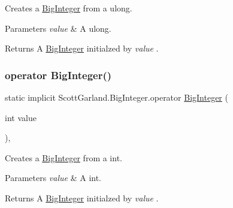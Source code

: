 Creates a \hyperlink{class_scott_garland_1_1_big_integer}{Big\+Integer} from a ulong. 


\begin{DoxyParams}{Parameters}
{\em value} & A ulong.\\
\hline
\end{DoxyParams}
\begin{DoxyReturn}{Returns}
A \hyperlink{class_scott_garland_1_1_big_integer}{Big\+Integer} initialzed by {\itshape value} .
\end{DoxyReturn}
\mbox{\label{class_scott_garland_1_1_big_integer_a3a17f77a3e90cf657d105559ad35fecf}} 
\subsubsection{\texorpdfstring{operator Big\+Integer()}{operator BigInteger()}\hspace{0.1cm}{\footnotesize\ttfamily [3/4]}}
{\footnotesize\ttfamily static implicit Scott\+Garland.\+Big\+Integer.\+operator \hyperlink{class_scott_garland_1_1_big_integer}{Big\+Integer} (\begin{DoxyParamCaption}\item[{int}]{value }\end{DoxyParamCaption})\hspace{0.3cm}{\ttfamily [inline]}, {\ttfamily [static]}}



Creates a \hyperlink{class_scott_garland_1_1_big_integer}{Big\+Integer} from a int. 


\begin{DoxyParams}{Parameters}
{\em value} & A int.\\
\hline
\end{DoxyParams}
\begin{DoxyReturn}{Returns}
A \hyperlink{class_scott_garland_1_1_big_integer}{Big\+Integer} initialzed by {\itshape value} .
\end{DoxyReturn}
\mbox{\label{class_scott_garland_1_1_big_integer_a4058c6d81e843425ed6b1ceb98706abe}} 
